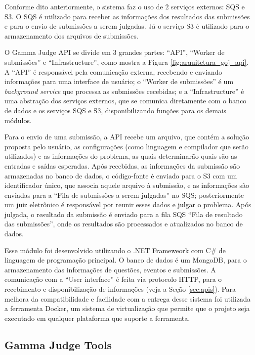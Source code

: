 Conforme dito anteriormente, o sistema faz o uso de 2 serviços externos: SQS e S3. O SQS é utilizado para receber as informações dos resultados das submissões e para o envio de submissões a serem julgadas. Já o serviço S3 é utilizado para o armazenamento dos arquivos de submissões. 

O Gamma Judge API se divide em 3 grandes partes: ``API'', ``Worker de submissões'' e ``Infrastructure'', como mostra a Figura \ref{fig:arquitetura_goj_api}. A ``API'' é responsável pela comunicação externa, recebendo e enviando informações para uma interface de usuário; o ``Worker de submissões'' é um \textit{background service} que processa as submissões recebidas; e a ``Infrastructure'' é uma abstração dos serviços externos, que se comunica diretamente com o banco de dados e os serviços SQS e S3, disponibilizando funções para os demais módulos.

Para o envio de uma submissão, a API recebe um arquivo, que contém a solução proposta pelo usuário, as configurações (como linguagem e compilador que serão utilizados) e as informações do problema, as quais determinarão quais são as entradas e saídas esperadas. Após recebidas, as informações da submissão são armazenadas no banco de dados, o código-fonte é enviado para o S3 com um identificador único, que associa aquele arquivo 
à submissão, e as informações são enviadas para a ``Fila de submissões a serem julgadas'' no SQS; posteriormente um juiz eletrônico é responsável por reunir esses dados e julgar o problema. Após julgada, o resultado da submissão é enviado para a fila SQS ``Fila de resultado das submissões'', onde os resultados são processados e atualizados no banco de dados.

Esse módulo foi desenvolvido utilizando o .NET Frameweork com C\# de linguagem de programação principal. O banco de dados é um MongoDB, para o armazenamento das informações de questões, eventos e submissões. A comunicação com a ``User interface'' é feita via protocolo HTTP, para o recebimento e disponibilização de informações (veja a Seção \ref{sec:apis}). Para melhora da compatibilidade e facilidade com a entrega desse sistema foi utilizada a ferramenta Docker, um sistema de virtualização que permite que o projeto seja executado em qualquer plataforma que suporte a ferramenta.

\subsection{Gamma Judge Tools} 
\label{subsec:arquitetura_judge_tools}

